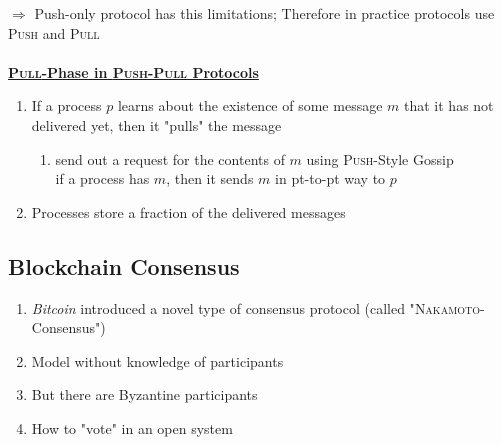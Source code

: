 \documentclass{article}
\begin{document}
\begin{adjustwidth}{2em}{2em}
\begin{adjustwidth}{2em}{2em}
\begin{adjustwidth}{2em}{}
				$\Rightarrow$ Push-only protocol has this limitations; Therefore in practice protocols use \textsc{Push} and \textsc{Pull} \\
				\hfill \\
				\underline{\textbf{\textsc{Pull}-Phase in \textsc{Push-Pull} Protocols}} \\
				\begin{enumerate}[-]
					\item If a process $p$ learns about the existence of some message $m$ that it has not delivered yet, then it "pulls" the message
					\begin{enumerate}[$\rightarrow$]
						\item send out a request for the contents of $m$ using \textsc{Push}-Style Gossip \\
						if a process has $m$, then it sends $m$ in pt-to-pt way to $p$
					\end{enumerate}
					\item Processes store a fraction of the delivered messages
				\end{enumerate}
			\end{adjustwidth}
		\end{adjustwidth}
		\subsection{Blockchain Consensus}
		\begin{adjustwidth}{2em}{2em}
			\begin{enumerate}[-]
				\item \textit{Bitcoin} introduced a novel type of consensus protocol (called "\textsc{Nakamoto}-Consensus")
				\item Model without knowledge of participants
				\item But there are Byzantine participants
				\item How to "vote" in an open system
			\end{enumerate}

\end{adjustwidth}
\end{adjustwidth}
\end{document}
